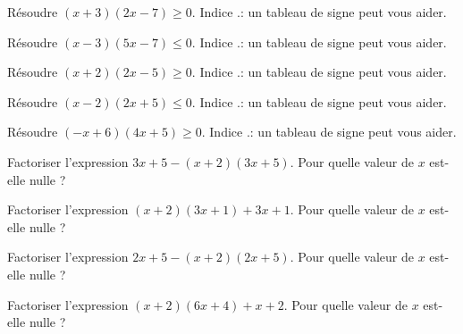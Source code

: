 
\begin{exercice}\label{exosmath-0462}

    \vspace{2cm}

    Résoudre \( (x+3)(2x-7)\geq 0\). Indice .: un tableau de signe peut vous aider.
    \vspace{2cm}

    Résoudre \( (x-3)(5x-7)\leq 0\). Indice .: un tableau de signe peut vous aider.
    \vspace{2cm}

    Résoudre \( (x+2)(2x-5)\geq 0\). Indice .: un tableau de signe peut vous aider.
    \vspace{2cm}

    Résoudre \( (x-2)(2x+5)\leq 0\). Indice .: un tableau de signe peut vous aider.
    \vspace{2cm}

    Résoudre \( (-x+6)(4x+5)\geq 0\). Indice .: un tableau de signe peut vous aider.
    \vspace{2cm}

    Factoriser l'expression \( 3x+5-(x+2)(3x+5)\). Pour quelle valeur de \( x\) est-elle nulle ?
    \vspace{2cm}

    Factoriser l'expression \( (x+2)(3x+1)+3x+1\). Pour quelle valeur de \( x\) est-elle nulle ?
    \vspace{2cm}

    Factoriser l'expression \( 2x+5-(x+2)(2x+5)\). Pour quelle valeur de \( x\) est-elle nulle ?
    \vspace{2cm}

    Factoriser l'expression \( (x+2)(6x+4)+x+2\). Pour quelle valeur de \( x\) est-elle nulle ?
    \vspace{2cm}

\end{exercice}
